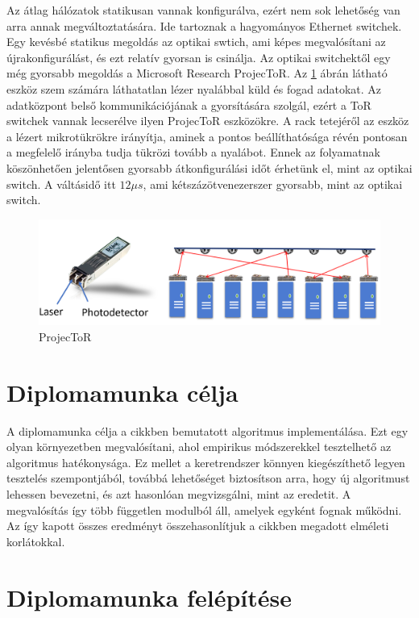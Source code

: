 \documentclass[12pt]{report}
\begin{document}
Az átlag hálózatok statikusan vannak konfigurálva, ezért nem sok lehetőség van arra annak megváltoztatására.
Ide tartoznak a hagyományos Ethernet switchek.
Egy kevésbé statikus megoldás az optikai swtich, ami képes megvalósítani az újrakonfigurálást, és ezt relatív gyorsan is csinálja.
Az optikai switchektől egy még gyorsabb megoldás a Microsoft Research ProjecToR. 
Az \ref{projector-fig} ábrán látható eszköz szem számára láthatatlan lézer nyalábbal küld és fogad adatokat.
Az adatközpont belső kommunikációjának a gyorsítására szolgál, ezért a ToR switchek vannak lecserélve ilyen ProjecToR eszközökre.
A rack tetejéről az eszköz a lézert mikrotükrökre irányítja, aminek a pontos beállíthatósága révén pontosan a megfelelő irányba tudja tükrözi tovább a nyalábot.
Ennek az folyamatnak köszönhetően jelentősen gyorsabb átkonfigurálási időt érhetünk el, mint az optikai switch.
A váltásidő itt $12\mu s$, ami kétszázötvenezerszer gyorsabb, mint az optikai switch.

\begin{figure}[h]
	\centering
	\includegraphics[width=0.9\linewidth]{pictures/laserswitch.png}
	\caption{ProjecToR}
	\label{projector-fig}
\end{figure}

\section{Diplomamunka célja}

A diplomamunka célja a cikkben \cite{avin_demand-aware_nodate} bemutatott algoritmus implementálása.
Ezt egy olyan környezetben megvalósítani, ahol empirikus módszerekkel tesztelhető az algoritmus hatékonysága.
Ez mellet a keretrendszer könnyen kiegészíthető legyen tesztelés szempontjából, továbbá lehetőséget biztosítson arra, hogy új algoritmust lehessen bevezetni, és azt hasonlóan megvizsgálni, mint az eredetit.
A megvalósítás így több független modulból áll, amelyek egyként fognak működni.
Az így kapott összes eredményt összehasonlítjuk a cikkben megadott elméleti korlátokkal.

\section{Diplomamunka felépítése}
\end{document}
